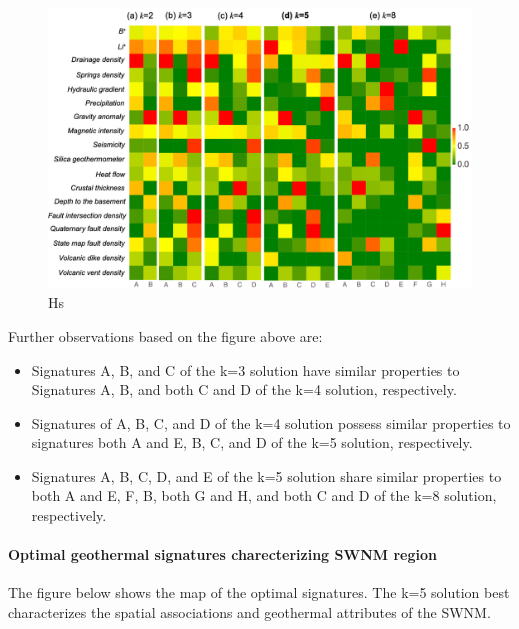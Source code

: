 \documentclass[11pt]{article}
\providecommand{\tightlist}{%
      \setlength{\itemsep}{0pt}\setlength{\parskip}{0pt}}
\begin{document}
\begin{figure}
\centering
\includegraphics{../figures-case01/signals.png}
\caption{Hs}
\end{figure}

Further observations based on the figure above are:

\begin{itemize}
\tightlist
\item
  Signatures A, B, and C of the k=3 solution have similar properties to
  Signatures A, B, and both C and D of the k=4 solution, respectively.
\item
  Signatures of A, B, C, and D of the k=4 solution possess similar
  properties to signatures both A and E, B, C, and D of the k=5
  solution, respectively.
\item
  Signatures A, B, C, D, and E of the k=5 solution share similar
  properties to both A and E, F, B, both G and H, and both C and D of
  the k=8 solution, respectively.
\end{itemize}

    \hypertarget{optimal-geothermal-signatures-charecterizing-swnm-region}{%
\paragraph{Optimal geothermal signatures charecterizing SWNM
region}\label{optimal-geothermal-signatures-charecterizing-swnm-region}}

The figure below shows the map of the optimal signatures. The k=5
solution best characterizes the spatial associations and geothermal
attributes of the SWNM.
\end{document}

